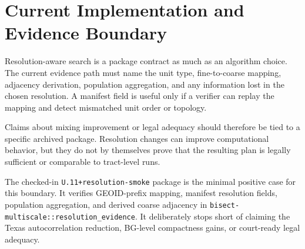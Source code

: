 \section{Current Implementation and Evidence Boundary}

Resolution-aware search is a package contract as much as an algorithm choice.
The current evidence path must name the unit type, fine-to-coarse mapping,
adjacency derivation, population aggregation, and any information lost in the
chosen resolution.  A manifest field is useful only if a verifier can replay the
mapping and detect mismatched unit order or topology.

Claims about mixing improvement or legal adequacy should therefore be tied to a
specific archived package.  Resolution changes can improve computational
behavior, but they do not by themselves prove that the resulting plan is
legally sufficient or comparable to tract-level runs.

The checked-in \texttt{U.11+resolution-smoke} package is the minimal positive
case for this boundary.  It verifies GEOID-prefix mapping, manifest resolution
fields, population aggregation, and derived coarse adjacency in
\texttt{bisect-multiscale::resolution\_evidence}.  It deliberately stops short
of claiming the Texas autocorrelation reduction, BG-level compactness gains, or
court-ready legal adequacy.
